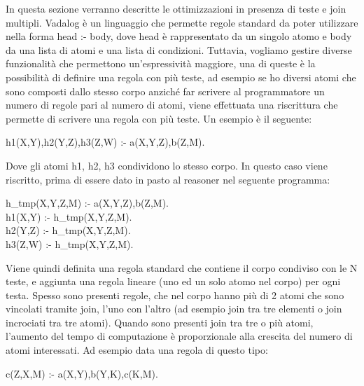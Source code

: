 In questa sezione verranno descritte le ottimizzazioni in presenza di teste e join multipli. \newline
Vadalog è un linguaggio che permette regole standard da poter utilizzare nella forma head :- body, dove head è rappresentato da un singolo atomo e body da una lista di atomi e una lista di condizioni. \newline
Tuttavia, vogliamo gestire diverse funzionalità che permettono un'espressività maggiore, una di queste è la possibilità di definire una regola con più teste, ad esempio se ho diversi atomi che sono composti dallo stesso corpo anziché far scrivere al programmatore un numero di regole pari al numero di atomi, viene effettuata una riscrittura che permette di scrivere una regola con più teste. Un esempio è il seguente: 

\begin{algorithm}
	h1(X,Y),h2(Y,Z),h3(Z,W) :- a(X,Y,Z),b(Z,M).
\end{algorithm}

Dove gli atomi h1, h2, h3 condividono lo stesso corpo. \newline
In questo caso viene riscritto, prima di essere dato in pasto al reasoner nel seguente programma: 

\begin{algorithm}
	h\_tmp(X,Y,Z,M) :- a(X,Y,Z),b(Z,M). \\
	h1(X,Y) :- h\_tmp(X,Y,Z,M). \\
	h2(Y,Z) :- h\_tmp(X,Y,Z,M). \\
	h3(Z,W) :- h\_tmp(X,Y,Z,M). 
\end{algorithm}

Viene quindi definita una regola standard che contiene il corpo condiviso con le N teste, e aggiunta una regola lineare (uno ed un solo atomo nel corpo) per ogni testa. \newline \newline
Spesso sono presenti regole, che nel corpo hanno più di 2 atomi che sono vincolati tramite join, l'uno con l'altro (ad esempio join tra tre elementi o join incrociati tra tre atomi). \newline
Quando sono presenti join tra tre o più atomi, l'aumento del tempo di computazione è proporzionale alla crescita del numero di atomi interessati. Ad esempio data una regola di questo tipo:

\begin{algorithm}
	c(Z,X,M) :- a(X,Y),b(Y,K),c(K,M).
\end{algorithm}

